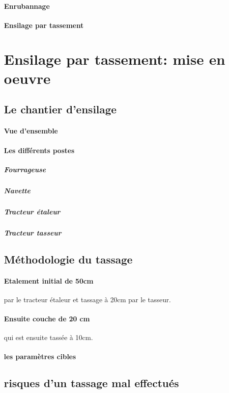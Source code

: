 \documentclass[12pt,a4paper]{report}
\begin{document}
\paragraph{Enrubannage}

\paragraph{Ensilage par tassement}

\section{Ensilage par tassement: mise en oeuvre}

\subsection{Le chantier d'ensilage}

\paragraph{Vue d'ensemble}

\paragraph{Les différents postes}
\subparagraph{Fourrageuse}
\subparagraph{Navette}
\subparagraph{Tracteur étaleur}
\subparagraph{Tracteur tasseur}

\subsection{Méthodologie du tassage}

\paragraph{Etalement initial de 50cm} par le tracteur étaleur et tassage à 20cm par le tasseur.

\paragraph{Ensuite couche de 20 cm} qui est ensuite tassée à 10cm.

\paragraph{les paramètres cibles}

\subsection{risques d'un tassage mal effectués}
\end{document}
